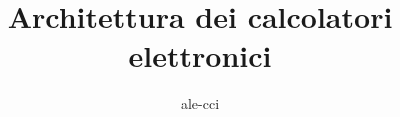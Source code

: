 \documentclass{custom}
\title{Architettura dei calcolatori elettronici}
\author{ale-cci}
\begin{document}
\maketitle{}












\newpage
\tableofcontents
\end{document}
